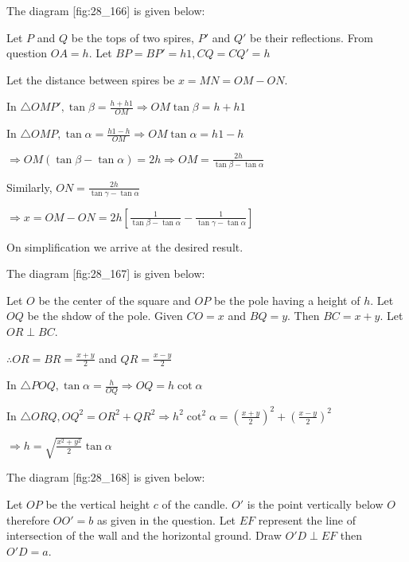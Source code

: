 \item The diagram [fig:28_166] is given below:

  \startplacefigure[reference=fig:28_166]
    \externalfigure[28_166.pdf]
  \stopplacefigure

  Let $P$ and $Q$ be the tops of two spires, $P'$ and $Q'$ be their
  reflections. From question $OA = h$. Let $BP = BP' = h1, CQ = CQ' = h$

  Let the distance between spires be $x = MN = OM - ON$.

  In $\triangle OMP', \tan\beta = \frac{h + h1}{OM} \Rightarrow OM\tan\beta = h + h1$

  In $\triangle OMP, \tan\alpha = \frac{h1 - h}{OM} \Rightarrow OM\tan\alpha = h1 - h$

  $\Rightarrow OM(\tan\beta - \tan\alpha) = 2h \Rightarrow OM = \frac{2h}{\tan\beta - \tan\alpha}$

  Similarly, $ON = \frac{2h}{\tan\gamma - \tan\alpha}$

  $\Rightarrow x = OM - ON = 2h\left[\frac{1}{\tan\beta - \tan\alpha} - \frac{1}{\tan\gamma
      -\tan\alpha}\right]$

  On simplification we arrive at the desired result.

\item The diagram [fig:28_167] is given below:

  \startplacefigure[reference=fig:28_167]
    \externalfigure[28_167.pdf]
  \stopplacefigure

  Let $O$ be the center of the square and $OP$ be the pole having a height of $h$. Let
  $OQ$ be the shdow of the pole. Given $CO = x$ and $BQ = y$. Then $BC = x +
  y$. Let $OR\perp BC$.

  $\therefore OR = BR = \frac{x + y}{2}$ and $QR = \frac{x - y}{2}$

  In $\triangle POQ, \tan\alpha = \frac{h}{OQ}\Rightarrow OQ = h\cot\alpha$

  In $\triangle ORQ, OQ^2 = OR^2 + QR^2 \Rightarrow h^2\cot^2\alpha = \left(\frac{x +
    y}{2}\right)^2 + \left(\frac{x - y}{2}\right)^2$

  $\Rightarrow h = \sqrt{\frac{x^2 + y^2}{2}}\tan\alpha$

\item The diagram [fig:28_168] is given below:

  \startplacefigure[reference=fig:28_168]
    \externalfigure[28_168.pdf]
  \stopplacefigure

  Let $OP$ be the vertical height $c$ of the candle. $O'$ is the point vertically below
  $O$ therefore $OO' = b$ as given in the question. Let $EF$ represent the line of
  intersection of the wall and the horizontal ground. Draw $O'D\perp EF$ then $O'D = a$.

